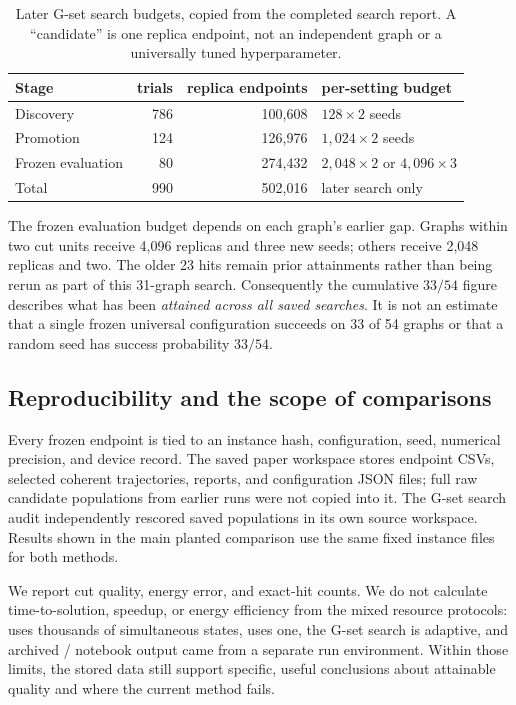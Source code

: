 \begin{table}[t]
\centering\small
\caption{Later G-set search budgets, copied from the completed search
report. A ``candidate'' is one replica endpoint, not an independent graph
or a universally tuned hyperparameter.}
\label{tab:gset-stage}
\begin{tabular*}{\textwidth}{@{\extracolsep{\fill}}lrrl}
\toprule
Stage & trials & replica endpoints & per-setting budget\\
\midrule
Discovery & 786 & 100,608 & $128\times2$ seeds\\
Promotion & 124 & 126,976 & $1{,}024\times2$ seeds\\
Frozen evaluation & 80 & 274,432 & $2{,}048\times2$ or $4{,}096\times3$\\
\midrule
Total & 990 & 502,016 & later search only\\
\bottomrule
\end{tabular*}
\end{table}

The frozen evaluation budget depends on each graph's earlier gap. Graphs
within two cut units receive 4,096 replicas and three new seeds;
others receive 2,048 replicas and two. The older 23 hits remain prior
attainments rather than being rerun as part of this 31-graph search.
Consequently the cumulative $33/54$ figure describes what has been
\emph{attained across all saved searches}. It is not an estimate that a
single frozen universal configuration succeeds on 33 of 54 graphs or
that a random seed has success probability $33/54$.

\subsection{Reproducibility and the scope of comparisons}

Every frozen endpoint is tied to an instance hash, configuration, seed,
numerical precision, and device record. The saved paper workspace stores
endpoint CSVs, selected coherent trajectories, reports, and configuration
JSON files; full raw candidate populations from earlier runs were not
copied into it. The G-set search audit independently rescored saved
populations in its own source workspace. Results shown in the main
planted comparison use the same fixed instance files for both methods.

We report cut quality, energy error, and exact-hit counts. We do not
calculate time-to-solution, speedup, or energy efficiency from the mixed
resource protocols: \QeFEM{} uses thousands of simultaneous states,
\LQA{} uses one, the G-set search is adaptive, and archived \FEM{}/\dSB{}
notebook output came from a separate run environment. Within those
limits, the stored data still support specific, useful conclusions about
attainable quality and where the current method fails.
